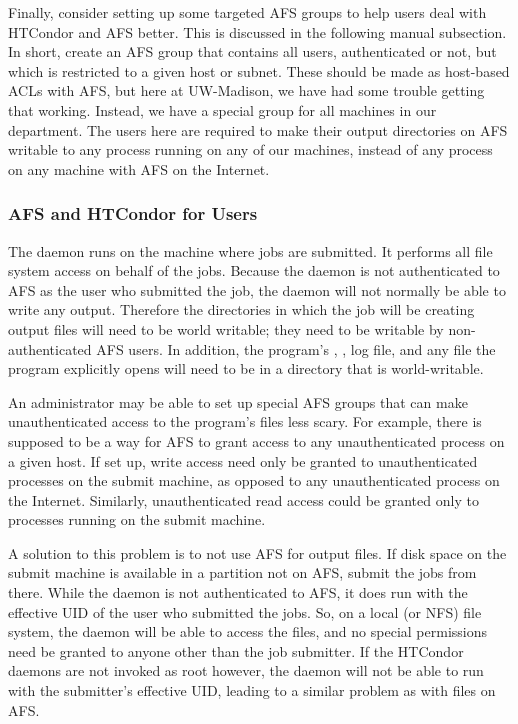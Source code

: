 Finally, consider setting up some targeted AFS groups to help 
users deal with HTCondor and AFS better.
This is discussed in the following manual subsection.
In short, create an AFS group that
contains all users, authenticated or not,
but which is restricted to a given host or subnet.
These should be made as host-based ACLs with AFS,
but here at UW-Madison, we have had some trouble getting that working.
Instead, we have a special group for all machines in our department.
The users here are required to make their output
directories on AFS writable to any process running on any of our
machines, instead of any process on any machine with AFS on the
Internet.

\subsubsection{\label{sec:HTCondor-AFS-Users}AFS and HTCondor for Users}

The  daemon runs on the machine where jobs are submitted.
It performs all file system access on behalf of the jobs.
Because the  daemon is not authenticated to AFS
as the user who submitted the job, the  daemon
will not normally be able to write any output.
Therefore the directories in which the job will be creating output files
will need to be world writable; they need to be writable by
non-authenticated AFS users.
In addition, the program's , , log file,
and any file the program explicitly opens
will need to be in a directory that is world-writable.

An administrator may be able to set up special AFS groups that can make 
unauthenticated access to the program's files less scary.
For example, there is
supposed to be a way for AFS to grant access to any unauthenticated
process on a given host. 
If set up,
write access need only be granted to unauthenticated processes 
on the submit machine,
as opposed to any unauthenticated process on the Internet.
Similarly,
unauthenticated read access could be granted only to processes running
on the submit machine.

A solution to this problem is to not use AFS for output files.
If disk space on the submit machine is available in a partition not on AFS,
submit the jobs from there.
While the  daemon is not authenticated to AFS,
it does run with the effective UID of the user who submitted the jobs.
So, on a local (or NFS) file system,
the  daemon will be able to access the files,
and no special permissions need be granted to anyone other than the job
submitter.
If the HTCondor daemons are not invoked as root however,
the  daemon will not be able to run with the submitter's
effective UID, leading to
a similar problem as with files on AFS.

